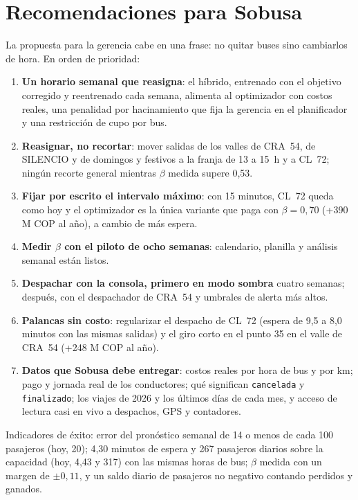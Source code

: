 \section{Recomendaciones para Sobusa}
\label{sec:recomendaciones}

La propuesta para la gerencia cabe en una frase: no quitar buses sino cambiarlos de hora. En orden de prioridad:
\begin{enumerate}
  \item \textbf{Un horario semanal que reasigna}: el híbrido, entrenado con el objetivo corregido y reentrenado cada
        semana, alimenta al optimizador con costos reales, una penalidad por hacinamiento que fija la gerencia en el
        planificador y una restricción de cupo por bus.
  \item \textbf{Reasignar, no recortar}: mover salidas de los valles de CRA~54, de SILENCIO y de domingos y festivos a la
        franja de 13 a 15~h y a CL~72; ningún recorte general mientras $\beta$ medida supere 0,53.
  \item \textbf{Fijar por escrito el intervalo máximo}: con 15 minutos, CL~72 queda como hoy y el optimizador es la única
        variante que paga con $\beta = 0{,}70$ (+390 M COP al año), a cambio de más espera.
  \item \textbf{Medir $\beta$ con el piloto de ocho semanas}: calendario, planilla y análisis semanal están listos.
  \item \textbf{Despachar con la consola, primero en modo sombra} cuatro semanas; después, con el despachador de CRA~54
        y umbrales de alerta más altos.
  \item \textbf{Palancas sin costo}: regularizar el despacho de CL~72 (espera de 9,5 a 8,0 minutos con las mismas
        salidas) y el giro corto en el punto 35 en el valle de CRA~54 (+248 M COP al año).
  \item \textbf{Datos que Sobusa debe entregar}: costos reales por hora de bus y por km; pago y jornada real de los
        conductores; qué significan \texttt{cancelada} y \texttt{finalizado}; los viajes de 2026 y los últimos días de
        cada mes, y acceso de lectura casi en vivo a despachos, GPS y contadores.
\end{enumerate}
Indicadores de éxito: error del pronóstico semanal de 14 o menos de cada 100 pasajeros (hoy, 20); 4,30 minutos de
espera y 267 pasajeros diarios sobre la capacidad (hoy, 4,43 y 317) con las mismas horas de bus; $\beta$ medida con un
margen de $\pm 0{,}11$, y un saldo diario de pasajeros no negativo contando perdidos y ganados.
